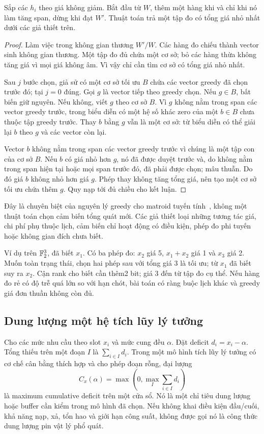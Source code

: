 \begin{proposition}\label{prop:measurementgreedy}
Sắp các $h_i$ theo giá không giảm. Bắt đầu từ $W$, thêm một hàng khi và chỉ khi nó làm tăng span, dừng khi đạt $W'$. Thuật toán trả một tập đo có tổng giá nhỏ nhất dưới các giả thiết trên.
\end{proposition}
\begin{proof}
Làm việc trong không gian thương $W'/W$. Các hàng đo chiếu thành vector sinh không gian thương. Một tập đo đủ chứa một cơ sở; bỏ các hàng thừa không tăng giá vì mọi giá không âm. Vì vậy chỉ cần tìm cơ sở có tổng giá nhỏ nhất.

Sau $j$ bước chọn, giả sử có một cơ sở tối ưu $B$ chứa các vector greedy đã chọn trước đó; tại $j=0$ đúng. Gọi $g$ là vector tiếp theo greedy chọn. Nếu $g\in B$, bất biến giữ nguyên. Nếu không, viết $g$ theo cơ sở $B$. Vì $g$ không nằm trong span các vector greedy trước, trong biểu diễn có một hệ số khác zero của một $b\in B$ chưa thuộc tập greedy trước. Thay $b$ bằng $g$ vẫn là một cơ sở: từ biểu diễn có thể giải lại $b$ theo $g$ và các vector còn lại.

Vector $b$ không nằm trong span các vector greedy trước vì chúng là một tập con của cơ sở $B$. Nếu $b$ có giá nhỏ hơn $g$, nó đã được duyệt trước và, do không nằm trong span hiện tại hoặc mọi span trước đó, đã phải được chọn; mâu thuẫn. Do đó giá $b$ không nhỏ hơn giá $g$. Phép thay không tăng tổng giá, nên tạo một cơ sở tối ưu chứa thêm $g$. Quy nạp tới đủ chiều cho kết luận.
\end{proof}
Đây là chuyên biệt của nguyên lý greedy cho matroid tuyến tính~\cite{edmonds}, không một thuật toán chọn cảm biến tổng quát mới. Các giả thiết loại những tương tác giá, chi phí phụ thuộc lịch, cảm biến chỉ hoạt động có điều kiện, phép đo phi tuyến hoặc không gian đích chưa biết.

Ví dụ trên $\mathbb F_2^3$, đã biết $x_1$. Có ba phép đo: $x_2$ giá 5, $x_1+x_2$ giá 1 và $x_3$ giá 2. Muốn toàn trạng thái, chọn hai phép sau với tổng giá 3 là tối ưu; từ $x_1$ đã biết suy ra $x_2$. Cận rank cho biết cần thêm2 bit; giá 3 đến từ tập đo cụ thể. Nếu hàng đo rẻ có độ trễ quá lớn so với hạn chót, bài toán có ràng buộc lịch khác và greedy giá đơn thuần không còn đủ.

\subsection{Dung lượng một hệ tích lũy lý tưởng}
Cho các mức nhu cầu theo slot $x_i$ và mức cung đều $\alpha$. Đặt deficit $d_i=x_i-\alpha$. Tổng thiếu trên một đoạn $I$ là $\sum_{i\in I}d_i$. Trong một mô hình tích lũy lý tưởng có cơ chế cân bằng thích hợp và cho phép đoạn rỗng, đại lượng
\[
C_x(\alpha)=\max\left(0,\max_I\sum_{i\in I}d_i\right)
\]
là maximum cumulative deficit trên một cửa sổ. Nó là một chỉ tiêu dung lượng hoặc buffer cần kiểm trong mô hình đã chọn. Nếu không khai điều kiện đầu/cuối, khả năng nạp, xả, tổn hao và giới hạn công suất, không được gọi nó là công thức dung lượng pin vật lý phổ quát.

